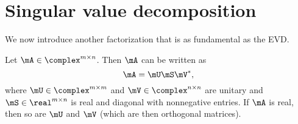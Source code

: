 

\begin{exercises}
  
\end{exercises}

\clearpage

\section{Singular value decomposition}
\label{sec:svd}

We now introduce another factorization that is as fundamental as the EVD.

\begin{thm}
  Let $\mA\in\complex^{m\times n}$. Then $\mA$ can be written as
  \begin{equation}
    \label{eq:svd}
    \mA = \mU \mS \mV^*,
  \end{equation}
  where $\mU\in\complex^{m\times m}$ and $\mV\in\complex^{n\times n}$ are
   unitary and $\mS\in\real^{m\times n}$ is real and diagonal with
  nonnegative entries. If $\mA$ is real, then so are $\mU$ and
  $\mV$ (which are then orthogonal matrices).
\end{thm}

